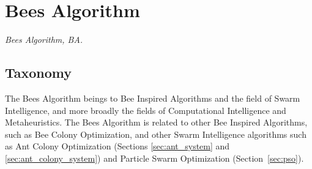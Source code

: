 

\section{Bees Algorithm} 
\label{sec:bees_algorithm}

\emph{Bees Algorithm, BA.}

\subsection{Taxonomy}
The Bees Algorithm beings to Bee Inspired Algorithms and the field of Swarm Intelligence, and more broadly the fields of Computational Intelligence and Metaheuristics.
The Bees Algorithm is related to other Bee Inspired Algorithms, such as Bee Colony Optimization, and other Swarm Intelligence algorithms such as Ant Colony Optimization (Sections \ref{sec:ant_system} and \ref{sec:ant_colony_system}) and Particle Swarm Optimization (Section~\ref{sec:pso}).

